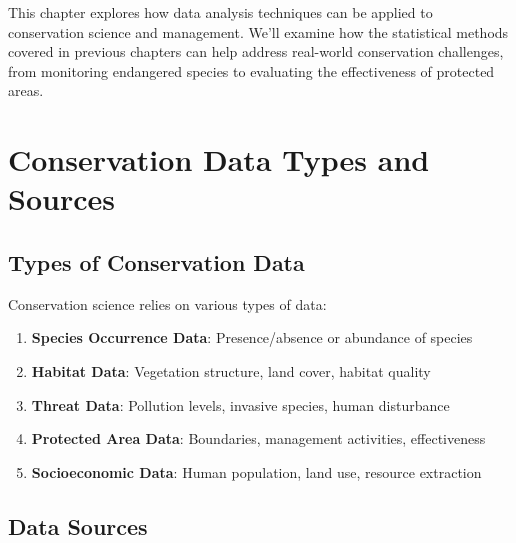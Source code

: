 \documentclass[
  letterpaper,
]{book}
\providecommand{\tightlist}{%
  \setlength{\itemsep}{0pt}\setlength{\parskip}{0pt}}
\begin{document}
This chapter explores how data analysis techniques can be applied to
conservation science and management. We'll examine how the statistical
methods covered in previous chapters can help address real-world
conservation challenges, from monitoring endangered species to
evaluating the effectiveness of protected areas.

\section{Conservation Data Types and
Sources}\label{conservation-data-types-and-sources}

\subsection{Types of Conservation
Data}\label{types-of-conservation-data}

Conservation science relies on various types of data:

\begin{enumerate}
\def\labelenumi{\arabic{enumi}.}
\tightlist
\item
  \textbf{Species Occurrence Data}: Presence/absence or abundance of
  species
\item
  \textbf{Habitat Data}: Vegetation structure, land cover, habitat
  quality
\item
  \textbf{Threat Data}: Pollution levels, invasive species, human
  disturbance
\item
  \textbf{Protected Area Data}: Boundaries, management activities,
  effectiveness
\item
  \textbf{Socioeconomic Data}: Human population, land use, resource
  extraction
\end{enumerate}

\subsection{Data Sources}\label{data-sources}
\end{document}
